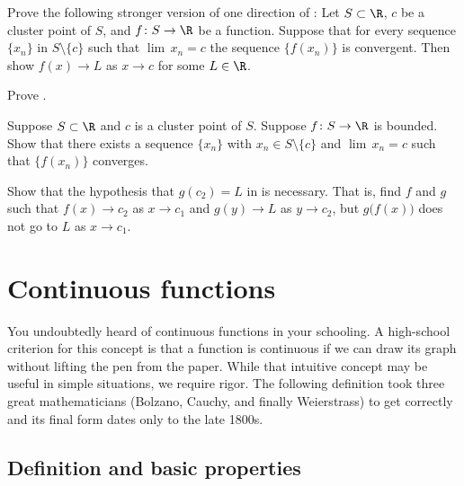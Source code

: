 \documentclass[12pt]{book}
\begin{document}
\begin{exercise} \label{exercise:seqflimitalt}
Prove the following stronger version of one direction of
:
Let $S \subset \R$, $c$ be a cluster point of $S$, and $f \colon S \to
\R$ be a function.
Suppose that for every sequence $\{x_n\}$ in $S \setminus \{c\}$ such that
$\lim\, x_n = c$ the sequence $\{ f(x_n) \}$ is convergent.
Then show $f(x) \to L$ as $x \to c$ for some $L \in \R$.
\end{exercise}

\begin{exercise}
Prove .
\end{exercise}

\begin{exercise}
Suppose $S \subset \R$ and $c$ is a cluster point of $S$.
Suppose $f \colon
S \to \R$ is bounded.
Show that there exists a sequence $\{ x_n \}$
with $x_n \in S \setminus \{ c \}$ and $\lim\, x_n = c$ such that
$\{ f(x_n) \}$ converges.
\end{exercise}

\begin{exercise}[Challenging] \label{exercise:contlimitbadcomposition}
Show that the hypothesis that $g(c_2) = L$ in
 is necessary.
That is, find $f$
and $g$ such that $f(x) \to c_2$ as $x \to c_1$ and
$g(y) \to L$ as $y \to c_2$, but $g\bigl(f(x)\bigr)$ does not go to $L$
as $x \to c_1$.
\end{exercise}


\sectionnewpage
\section{Continuous functions}
\label{sec:cont}


You undoubtedly heard of continuous functions in your schooling.
A
high-school criterion for this concept is that a function is continuous if
we can draw its graph without lifting the pen from the paper.
While that
intuitive concept may be useful in simple situations, we require
rigor.
The following definition took three great mathematicians
(Bolzano, Cauchy, and finally Weierstrass) to get correctly and its final
form dates only to the late 1800s.

\subsection*{Definition and basic properties}
\end{document}

